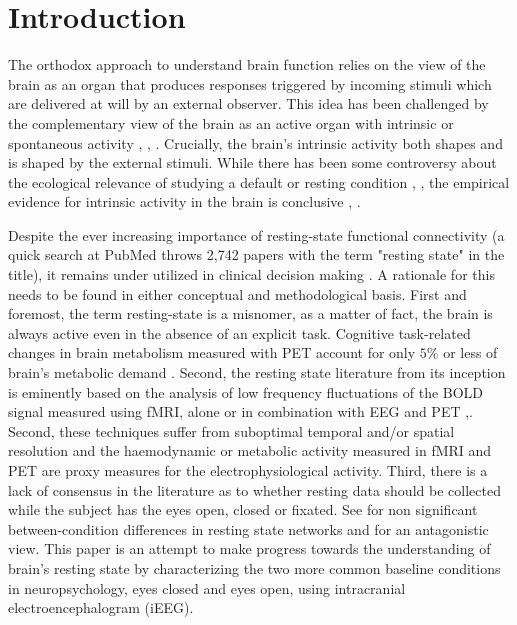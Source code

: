 \documentclass[11pt, onecolumn]{article}
\begin{document}
\section{Introduction}
The orthodox approach to understand brain function relies on the view of the brain as an organ that produces responses triggered by incoming stimuli which are delivered at will by an external observer. This idea has been challenged by the complementary view of the brain as an active organ with intrinsic or spontaneous activity \citep{llinas_intrinsic_1988}, \citep{biswal_functional_1995}, \citep{papo2013should}. Crucially, the brain's intrinsic activity both shapes and is shaped by the external stimuli.
While there has been some controversy about the ecological relevance of studying a default or resting condition \citep{buckner2007unrest}, \citep{morcom2007does}, the empirical evidence for intrinsic activity in the brain is conclusive \citep{wang2006changes}, \citep{mantini2007electrophysiological}. 

Despite the ever increasing importance of resting-state functional connectivity (a quick search  at PubMed throws 2,742 papers with the term "resting state" in the title), it remains under utilized in clinical decision making \citep{tracy2015resting}.
A rationale for this needs to be found in either conceptual and methodological basis. First and foremost, the term resting-state is a misnomer, as a matter of fact, the brain is always active even in the absence of an explicit task. Cognitive task-related changes in brain metabolism measured with PET account for only $5\%$ or less of brain's metabolic demand \citep{sokoloff1955effect}. 
Second, the resting state literature from its inception is eminently based on the analysis of low frequency fluctuations of the BOLD signal measured using fMRI, alone or in combination with EEG and PET \citep{van2010exploring},\citep{musso2010spontaneous}. Second, these techniques suffer from suboptimal temporal and/or spatial resolution and the haemodynamic or metabolic activity measured in fMRI and PET are proxy measures for the electrophysiological activity. Third, there is a lack of consensus in the literature as to whether resting data should be collected while the subject has the eyes open, closed or fixated. See \citep{patriat2013effect} for non significant between-condition differences in resting state networks and \citep{yan2009spontaneous} for an antagonistic view. 
This paper is an attempt to make progress towards the understanding of brain's resting state by characterizing the two more common baseline conditions in neuropsychology, eyes closed and eyes open, using intracranial electroencephalogram (iEEG).
\end{document}

